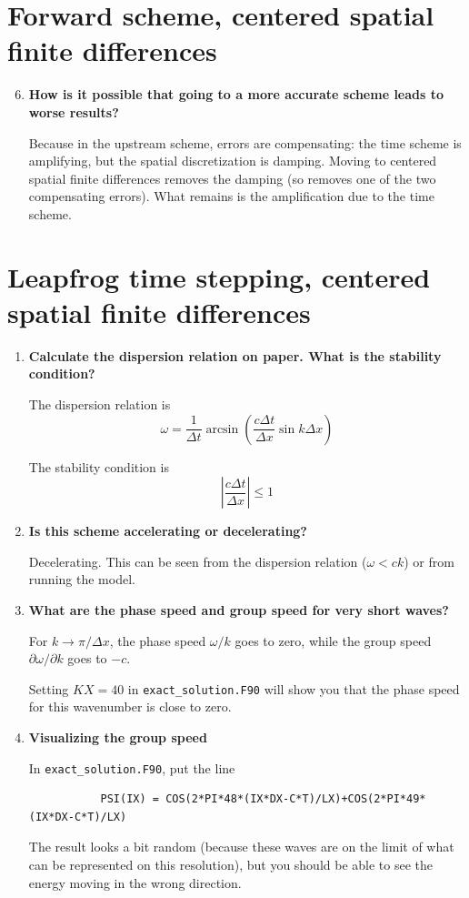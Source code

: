 \documentclass[a4paper,fleqn]{article}
\begin{document}
\section{Forward scheme, centered spatial finite differences}
%
\begin{enumerate}
	\setcounter{enumi}{5}
	\item \textbf{ How is it possible that going to a more accurate scheme leads to worse results?}
		\par
		Because in the upstream scheme, errors are compensating: the time scheme is amplifying, but the spatial discretization is damping. Moving to centered spatial finite differences removes the damping (so removes one of the two compensating errors). What remains is the amplification due to the time scheme.
\end{enumerate}
%
\section{Leapfrog time stepping, centered spatial finite differences}
%
\begin{enumerate}
	\item \textbf{Calculate the dispersion relation on paper. What is the stability condition?}
		\par
		The dispersion relation is
		\begin{equation*}
			\omega=\frac{1}{\Delta t}\arcsin\left(\frac{c\Delta t}{\Delta x}\sin k\Delta x\right)
		\end{equation*}
		\par
		The stability condition is
		\begin{equation*}
			\left|\frac{c\Delta t}{\Delta x}\right|\leq1
		\end{equation*}\vspace{2ex}
	\setcounter{enumi}{6}
	\item \textbf{Is this scheme accelerating or decelerating?}
		\par
		Decelerating. This can be seen from the dispersion relation ($\omega<ck$) or from running the model.\vspace{2ex}
	\item \textbf{What are the phase speed and group speed for very short waves?}
		\par
		For $k\rightarrow\pi/\Delta x$, the phase speed $\omega/k$ goes to zero, while the group speed $\partial \omega/\partial k$ goes to $-c$.
		\par
		Setting $KX=40$ in \texttt{exact\_solution.F90} will show you that the phase speed for this wavenumber is close to zero.\vspace{2ex}
	\item \textbf{Visualizing the group speed}
		\par
		In \texttt{exact\_solution.F90}, put the line
		\begin{verbatim}
		   PSI(IX) = COS(2*PI*48*(IX*DX-C*T)/LX)+COS(2*PI*49*(IX*DX-C*T)/LX)
		\end{verbatim}
		The result looks a bit random (because these waves are on the limit of what can be represented on this resolution), but you should be able to see the energy moving in the wrong direction.
\end{enumerate}
\end{document}
